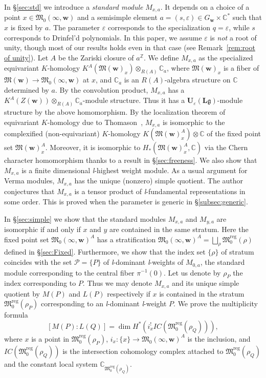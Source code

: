 \documentclass[12pt]{amsart}
\def\Bbb{\mathbb}
\def\frak{\mathfrak}
\theoremstyle{definition}
\theoremstyle{remark}
\numberwithin{equation}{subsection}
\newcommand{\secref}[1]{\S\ref{#1}}
\newcommand{\subsecref}[1]{\S\ref{#1}}
\newcommand{\remref}[1]{Remark~\ref{#1}}
\newcommand{\C}{{\Bbb C}}
\newcommand{\Z}{{\Bbb Z}}
\newcommand{\M}{{\frak M}} %
\newcommand{\Mreg}{{\frak M_0^{\operatorname{reg}}}}
\newcommand{\bw}{{\mathbf w}} %
\newcommand{\Ule}{{\mathbf U}_{\varepsilon}({\mathbf L}\mathfrak g)}
\newcommand{\Zw}{Z(\bw)}
\newcommand{\Mw}{\M(\bw)}
\begin{document}
In \secref{sec:std} we introduce a {\it standard module\/}
$M_{x,a}$. It depends on a choice of a point $x\in\M_0(\infty,\bw)$
and a semisimple element $a = (s,\varepsilon)\in G_\bw\times\C^*$ such
that $x$ is fixed by $a$.
%
The parameter $\varepsilon$ corresponds to the specialization $q =
\varepsilon$, while $s$ corresponds to Drinfel'd polynomials.
%
In this paper, we assume $\varepsilon$ is {\it not\/} a root of unity, 
though most of our results holds even in that case (see
\remref{rem:root of unity}).
%
Let $A$ be the Zariski closure of $a^{\Z}$. We define $M_{x,a}$ as the
specialized equivariant $K$-homology $K^A(\Mw_x)\otimes_{R(A)}\C_a$,
where $\Mw_x$ is a fiber of $\Mw\to\M_0(\infty,\bw)$ at $x$, and
$\C_a$ is an $R(A)$-algebra structure on $\C$ determined by $a$.
%
By the convolution product, $M_{x,a}$ has a
$K^A(\Zw)\otimes_{R(A)}\C_a$-module structure. Thus it has a
$\Ule$-module structure by the above homomorphism.
%
By the localization theorem of equivariant $K$-homology due to
Thomason~\cite{T-loc}, $M_{x,a}$ is isomorphic to the
complexified (non-equivariant) $K$-homology $K(\Mw_x^A)\otimes\C$ of
the fixed point set $\Mw_x^A$.
%
Moreover, it is isomorphic to $H_*(\Mw_x^A,\C)$ via the Chern
character homomorphism thanks to a result in \secref{sec:freeness}.
%
We also show that $M_{x,a}$ is a finite dimensional
{\it l\/}-highest weight module.
%
As a usual argument for Verma modules, $M_{x,a}$ has the unique
(nonzero) simple quotient.
%
The author conjectures that $M_{x,a}$ is a tensor product of {\it
l\/}-fundamental representations in some order. This is proved when
the parameter is generic in \subsecref{subsec:generic}.

In \secref{sec:simple} we show that the standard modules $M_{x,a}$ and
$M_{y,a}$ are isomorphic if and only if $x$ and $y$ are contained in
the same stratum.
%
Here the fixed point set $\M_0(\infty,\bw)^A$ has a stratification
$\M_0(\infty,\bw)^A = \bigsqcup_\rho \Mreg(\rho)$ defined in
\secref{sec:Fixed}.
%
Furthermore, we show that the index set $\{ \rho \}$ of stratum
coincides with the set $\mathcal P = \{ P \}$ of {\it l\/}-dominant
{\it l\/}-weights of $M_{0,a}$, the standard module corresponding to
the central fiber $\pi^{-1}(0)$. Let us denote by $\rho_P$ the index
corresponding to $P$.
%
Thus we may denote $M_{x,a}$ and its unique simple quotient by $M(P)$
and $L(P)$ respectively if $x$ is contained in the stratum
$\Mreg(\rho_P)$ corresponding to an {\it l\/}-dominant {\it
l\/}-weight $P$. We prove the multiplicity formula 
\[
   \left[ M(P) : L(Q) \right]
   = \dim H^*(i_x^! IC(\Mreg(\rho_Q))),
\]
where $x$ is a point in $\Mreg(\rho_P)$,
$i_x\colon \{x\}\to \M_0(\infty,\bw)^A$ is the inclusion,
and $IC(\Mreg(\rho_Q))$ is the intersection cohomology complex
attached to $\Mreg(\rho_Q)$ and the constant local system
$\C_{\Mreg(\rho_Q)}$.
\end{document}
